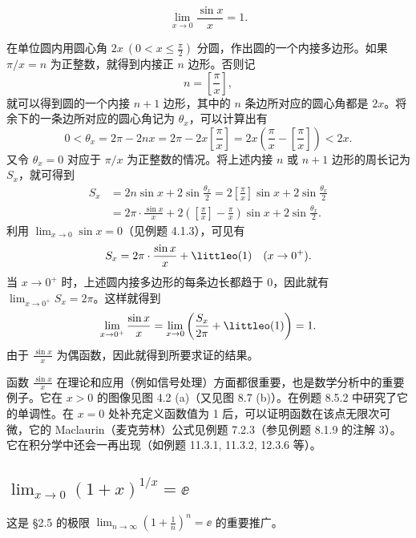 \begin{xproposition}[4.3.1（第一个重要极限）]
\[
  \lim_{x\to0}\frac{\sin x}{x}=1.
\]
\end{xproposition}
\begin{xproof}
在单位圆内用圆心角 $2x\ (0<x\leq\frac\pi2)$ 分圆，作出圆的一个内接多边形。如果 $\pi/x=n$ 为正整数，就得到内接正 $n$ 边形。否则记
\[
  n=\left[\frac\pi x\right],
\]
就可以得到圆的一个内接 $n+1$ 边形，其中的 $n$ 条边所对应的圆心角都是 $2x$。将余下的一条边所对应的圆心角记为 $\theta_x$，可以计算出有
\[
  0<\theta_x=2\pi-2nx=2\pi-2x\left[\frac\pi x\right]
  =2x\left(\frac\pi x-\left[\frac\pi x\right]\right)<2x.
\]
又令 $\theta_x=0$ 对应于 $\pi/x$ 为正整数的情况。将上述内接 $n$ 或 $n+1$ 边形的周长记为 $S_x$，就可得到
\begin{align*}
  S_x&=2n\sin x+2\sin\frac{\theta_x}2
  =2\left[\frac\pi x\right]\sin x+2\sin\frac{\theta_x}2\\
  &=2\pi\cdot\frac{\sin x}{x}
  +2\left(\left[\frac\pi x\right]-\frac\pi x\right)\sin x
  +2\sin\frac{\theta_x}2.
\end{align*}
利用 $\lim_{x\to0}\sin x=0$（见例题 4.1.3），可见有
\[
  S_x=2\pi\cdot\frac{\sin x}{x}+\littleo(1)\quad(x\to0^+).
\]
当 $x\to0^+$ 时，上述圆内接多边形的每条边长都趋于 0，因此就有 $\lim_{x\to0^+}S_x=2\pi$。这样就得到
\[
  \lim_{x\to0^+}\frac{\sin x}{x}
  =\lim_{x\to0}\left(\frac{S_x}{2\pi}+\littleo(1)\right)=1.
\]
由于 $\frac{\sin x}{x}$ 为偶函数，因此就得到所要求证的结果。
\end{xproof}

\begin{xremark}
函数 $\frac{\sin x}{x}$ 在理论和应用（例如信号处理）方面都很重要，也是数学分析中的重要例子。它在 $x>0$ 的图像见图 4.2 (a)（又见图 8.7 (b)）。在例题 8.5.2 中研究了它的单调性。在 $x=0$ 处补充定义函数值为 1 后，可以证明函数在该点无限次可微，它的 Maclaurin（麦克劳林）公式见例题 7.2.3（参见例题 8.1.9 的注解 3）。它在积分学中还会一再出现（如例题 11.3.1, 11.3.2, 12.3.6 等）。
\end{xremark}

\subsection{\texorpdfstring{$\displaystyle\lim_{x\to0}(1+x)^{1/x}=\ee$}{极限 (1+x) 的 1/x 次幂 = e}}

这是 §2.5 的极限 $\lim_{n\to\infty}(1+\frac1n)^n=\ee$ 的重要推广。

